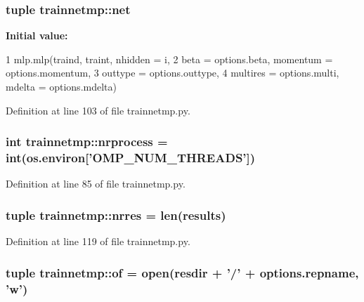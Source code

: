 \hypertarget{namespacetrainnetmp_abc8273df12ede80d1022efecac2e6883}{
\subsubsection[{net}]{\setlength{\rightskip}{0pt plus 5cm}tuple {\bf trainnetmp::net}}}
\label{namespacetrainnetmp_abc8273df12ede80d1022efecac2e6883}
{\bfseries Initial value:}
\begin{DoxyCode}
1 mlp.mlp(traind, traint, nhidden = i,
2                           beta = options.beta, momentum = options.momentum, 
3                           outtype = options.outtype, 
4                           multires = options.multi, mdelta = options.mdelta)
\end{DoxyCode}


Definition at line 103 of file trainnetmp.py.

\hypertarget{namespacetrainnetmp_a0ce23022a012fafdc81c769f9ea2ae84}{
\subsubsection[{nrprocess}]{\setlength{\rightskip}{0pt plus 5cm}int {\bf trainnetmp::nrprocess} = int(os.environ\mbox{[}'OMP\_\-NUM\_\-THREADS'\mbox{]})}}
\label{namespacetrainnetmp_a0ce23022a012fafdc81c769f9ea2ae84}


Definition at line 85 of file trainnetmp.py.

\hypertarget{namespacetrainnetmp_aeaf295e503c8c7a7eb9d4e5a77ed5499}{
\subsubsection[{nrres}]{\setlength{\rightskip}{0pt plus 5cm}tuple {\bf trainnetmp::nrres} = len({\bf results})}}
\label{namespacetrainnetmp_aeaf295e503c8c7a7eb9d4e5a77ed5499}


Definition at line 119 of file trainnetmp.py.

\hypertarget{namespacetrainnetmp_a5348e04a55d2a7563398585f1b851efa}{
\subsubsection[{of}]{\setlength{\rightskip}{0pt plus 5cm}tuple {\bf trainnetmp::of} = open({\bf resdir} + '/' + options.repname, 'w')}}
\label{namespacetrainnetmp_a5348e04a55d2a7563398585f1b851efa}


